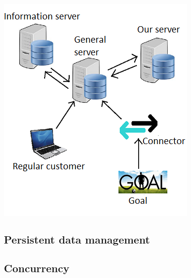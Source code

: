 \begin{center}
\includegraphics[scale=0.68]{Server_model.png}
\end{center}

\subsection{Persistent data management}
\subsection{Concurrency}





